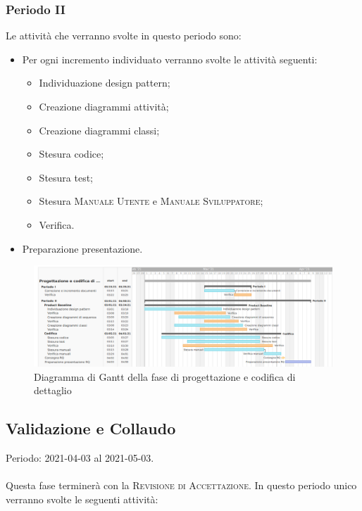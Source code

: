 \documentclass[../piano_di_progetto.tex]{subfiles}
\begin{document}
\subsubsection{Periodo II}
Le attività che verranno svolte in questo periodo sono:
\begin{itemize}
    \item Per ogni incremento individuato verranno svolte le attività seguenti: 
    \begin{itemize}
        \item Individuazione design pattern;
        \item Creazione diagrammi attività;
        \item Creazione diagrammi classi;
        \item Stesura codice;
        \item Stesura test;
        \item Stesura \textsc{Manuale Utente} e \textsc{Manuale Sviluppatore};
        \item Verifica.
    \end{itemize}
    \item Preparazione presentazione.
\end{itemize}

\begin{figure}[H]
\centering
\includegraphics[width=18cm]{src/img/gantt/03_RQ_alternative.png}
\caption{Diagramma di Gantt della fase di progettazione e codifica di dettaglio}
\end{figure}

\subsection{Validazione e Collaudo}%
\label{sub:valid_coll}
Periodo: 2021-04-03 al 2021-05-03.\\ \\ 
Questa fase terminerà con la \textsc{Revisione di Accettazione}. In questo periodo unico verranno svolte le seguenti attività:
\end{document}
